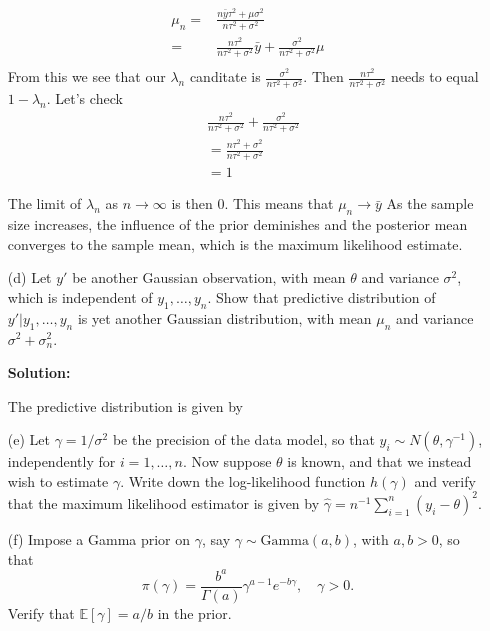 \documentclass{article}
\begin{document}
\begin{enumerate}
    \begin{align*}
        \mu_n =& \frac{n \bar{y} \tau^2 + \mu \sigma^2}{n \tau^2 + \sigma^2}\\
        =& \frac{n \tau^2}{n \tau^2 + \sigma^2} \bar{y} + \frac{\sigma^2}{n \tau^2 + \sigma^2} \mu\\
    \end{align*}
    From this we see that our $\lambda_n$ canditate is $\frac{\sigma^2}{n \tau^2 + \sigma^2}$.
    Then $ \frac{n \tau^2}{n \tau^2 + \sigma^2}$ needs to equal $1 - \lambda_n$. Let's check
    \begin{align*}
        &\frac{n \tau^2}{n \tau^2 + \sigma^2} + \frac{\sigma^2}{n \tau^2 + \sigma^2}\\
        &= \frac{n \tau^2 + \sigma^2}{n \tau^2 + \sigma^2}\\
        &= 1
    \end{align*}

    The limit of $\lambda_n$ as $n \to \infty$ is then $0$. This means that $\mu_n \to \bar{y}$
    As the sample size increases, the influence of the prior deminishes and the posterior mean 
    converges to the sample mean, which is the maximum likelihood estimate.


    \item[(d)] Let $y'$ be another Gaussian observation, with mean $\theta$ and variance $\sigma^2$, which is independent of $y_1, \dots, y_n$. Show that predictive distribution of $y' | y_1, \dots, y_n$ is yet another Gaussian distribution, with mean $\mu_n$ and variance $\sigma^2 + \sigma_n^2$.

    \textbf{Solution:}
    \par
    The predictive distribution is given by
    
    \item[(e)] Let $\gamma = 1/\sigma^2$ be the precision of the data model, so that $y_i \sim N(\theta, \gamma^{-1})$, independently for $i = 1, \dots, n$. Now suppose $\theta$ is known, and that we instead wish to estimate $\gamma$. Write down the log-likelihood function $h(\gamma)$ and verify that the maximum likelihood estimator is given by $\hat{\gamma} = n^{-1} \sum_{i=1}^n (y_i - \theta)^2$.
    
    \item[(f)] Impose a Gamma prior on $\gamma$, say $\gamma \sim \text{Gamma}(a, b)$, with $a, b > 0$, so that
    \[
    \pi(\gamma) = \frac{b^a}{\Gamma(a)} \gamma^{a-1} e^{-b\gamma}, \quad \gamma > 0.
    \]
    Verify that $\mathbb{E}[\gamma] = a/b$ in the prior.
    

\end{enumerate}
\end{document}
